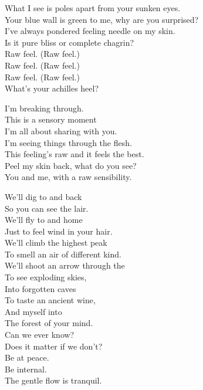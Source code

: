 
What I see is poles apart from your sunken eyes. \\
Your blue wall is green to me, why are you surprised? \\
I've always pondered feeling needle on my skin. \\
Is it pure bliss or complete chagrin? \\

Raw feel. (Raw feel.) \\
Raw feel. (Raw feel.) \\
Raw feel. (Raw feel.) \\
What's your achilles heel? \\


I'm breaking through. \\
This is a sensory moment \\
I'm all about sharing with you. \\
I'm seeing things through the flesh. \\
This feeling's raw and it feels the best. \\
Peel my skin back, what do you see? \\
You and me, with a raw sensibility. \\


We'll dig to  and back \\
So you can see the  lair. \\
We'll fly to  and home \\
Just to feel wind in your hair. \\

We'll climb the highest peak \\
To smell an air of different kind. \\
We'll shoot an arrow through the  \\
To see exploding skies, \\
Into forgotten caves \\
To taste an ancient wine, \\
And  myself into \\
The forest of your mind. \\

Can we ever know? \\
Does it matter if we don't? \\
Be at peace. \\
Be internal. \\
The gentle flow is tranquil. \\


